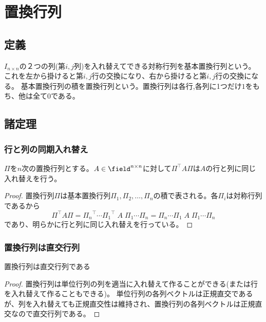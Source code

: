 \chapter{置換行列}
    \section{定義}
        \begin{definition}
            \quad\par
            $I_{n\times n}$の２つの列(第$i,j$列)を入れ替えてできる対称行列を基本置換行列という。
            これを左から掛けると第$i,j$行の交換になり、右から掛けると第$i,j$行の交換になる。
            基本置換行列の積を置換行列という。置換行列は各行,各列に1つだけ$1$をもち、他は全て$0$である。
        \end{definition}
    \section{諸定理}
        \subsection{行と列の同期入れ替え}
            \begin{shadebox}
                $\Pi$を$n$次の置換行列とする。$A\in\field^{n\times n}$に対して$\Pi^\top A\Pi$は$A$の行と列に同じ入れ替えを行う。
            \end{shadebox}
            \begin{proof}
                \quad\par
                置換行列$\Pi$は基本置換行列$\Pi_1,\Pi_2,\dotsc,\Pi_n$の積で表される。各$\Pi_i$は対称行列であるから
                \[\Pi^\top A\Pi = {\Pi_n}^\top\dotsm{\Pi_1}^\top\;A\;\Pi_1\dotsm\Pi_n = \Pi_n\dotsm\Pi_1\;A\;\Pi_1\dotsm\Pi_n\]
                であり、明らかに行と列に同じ入れ替えを行っている。
            \end{proof}
        \subsection{置換行列は直交行列}
            \begin{shadebox}
                置換行列は直交行列である
            \end{shadebox}
            \begin{proof}
                \quad\par
                置換行列は単位行列の列を適当に入れ替えて作ることができる(または行を入れ替えて作ることもできる)。
                単位行列の各列ベクトルは正規直交であるが、列を入れ替えても正規直交性は維持され、置換行列の各列ベクトルは正規直交なので直交行列である。
            \end{proof}